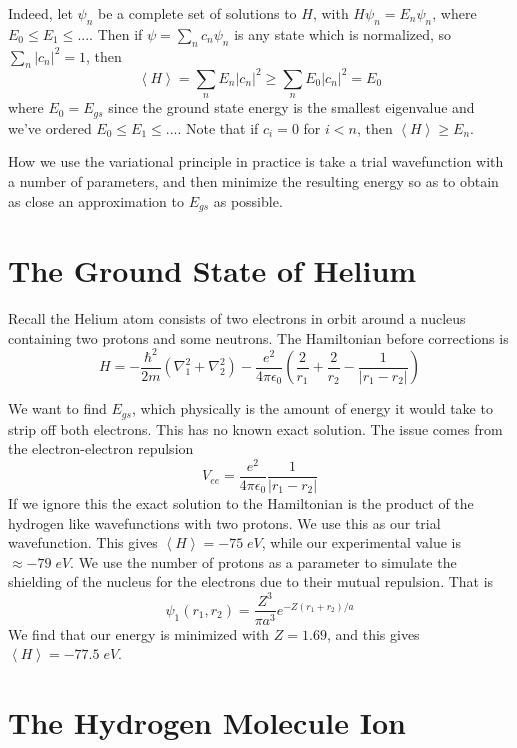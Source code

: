 \documentclass[12pt, a4paper, oneside, openright, titlepage]{book}
\newcommand{\brkt}[1]{\left\langle #1\right\rangle}
\begin{document}
Indeed, let $\psi_n$ be a complete set of solutions to $H$, with $H\psi_n = E_n\psi_n$, where $E_0 \leq E_1 \leq ...$. Then if $\psi = \sum_nc_n\psi_n$ is any state which is normalized, so $\sum_n|c_n|^2 = 1$, then $$\brkt{H} =\sum_nE_n|c_n|^2 \geq \sum_nE_0|c_n|^2 = E_0$$
where $E_0 = E_{gs}$ since the ground state energy is the smallest eigenvalue and we've ordered $E_0 \leq E_1 \leq ...$. Note that if $c_i = 0$ for $i < n$, then $\brkt{H} \geq E_n$.

How we use the variational principle in practice is take a trial wavefunction with a number of parameters, and then minimize the resulting energy so as to obtain as close an approximation to $E_{gs}$ as possible.

\section{The Ground State of Helium}

Recall the Helium atom consists of two electrons in orbit around a nucleus containing two protons and some neutrons. The Hamiltonian before corrections is $$H = -\frac{\hbar^2}{2m}\left(\nabla^2_1+\nabla^2_2\right) - \frac{e^2}{4\pi\epsilon_0}\left(\frac{2}{r_1}+\frac{2}{r_2}-\frac{1}{|r_1-r_2|}\right)$$

We want to find $E_{gs}$, which physically is the amount of energy it would take to strip off both electrons. This has no known exact solution. The issue comes from the electron-electron repulsion $$V_{ee} = \frac{e^2}{4\pi\epsilon_0}\frac{1}{|r_1-r_2|}$$
If we ignore this the exact solution to the Hamiltonian is the product of the hydrogen like wavefunctions with two protons. We use this as our trial wavefunction. This gives $\brkt{H} = -75\;eV$, while our experimental value is $\approx -79\;eV$. We use the number of protons as a parameter to simulate the shielding of the nucleus for the electrons due to their mutual repulsion. That is $$\psi_1(r_1,r_2) = \frac{Z^3}{\pi a^3}e^{-Z(r_1+r_2)/a}$$
We find that our energy is minimized with $Z = 1.69$, and this gives $\brkt{H} = -77.5\;eV$.

\section{The Hydrogen Molecule Ion}
\end{document}
